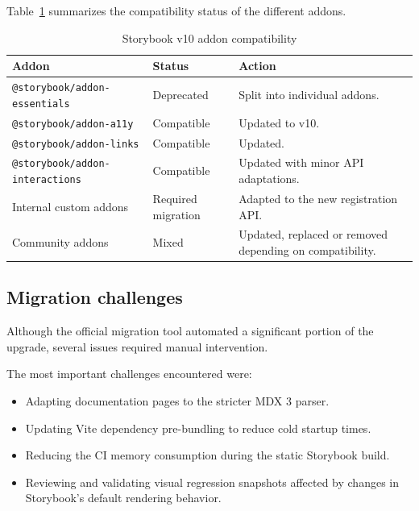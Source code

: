Table~\ref{tab:addon-compat} summarizes the compatibility status of the different addons.

\begin{table}[H]
    \centering
    \begin{tabularx}{\textwidth}{|l|l|X|}
        \hline
        \textbf{Addon} & \textbf{Status} & \textbf{Action} \\
        \hline
        \texttt{@storybook/addon-essentials} & Deprecated &
        Split into individual addons. \\
        \hline
        \texttt{@storybook/addon-a11y} & Compatible &
        Updated to v10. \\
        \hline
        \texttt{@storybook/addon-links} & Compatible &
        Updated. \\
        \hline
        \texttt{@storybook/addon-interactions} & Compatible &
        Updated with minor API adaptations. \\
        \hline
        Internal custom addons & Required migration &
        Adapted to the new registration API. \\
        \hline
        Community addons & Mixed &
        Updated, replaced or removed depending on compatibility. \\
        \hline
    \end{tabularx}
    \caption{Storybook v10 addon compatibility}
    \label{tab:addon-compat}
\end{table}

\subsection{Migration challenges}

Although the official migration tool automated a significant portion of the upgrade, several issues required manual intervention.

The most important challenges encountered were:

\begin{itemize}
    \item Adapting documentation pages to the stricter MDX 3 parser.
    \item Updating Vite dependency pre-bundling to reduce cold startup times.
    \item Reducing the CI memory consumption during the static Storybook build.
    \item Reviewing and validating visual regression snapshots affected by changes in Storybook's default rendering behavior.
\end{itemize}


